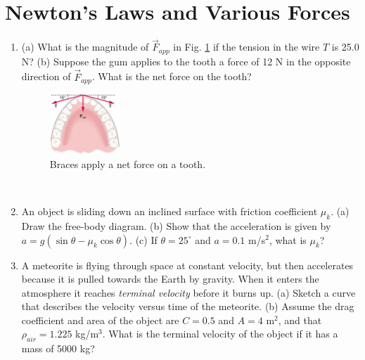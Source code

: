 \documentclass[10pt]{article}
\begin{document}
\section{Newton's Laws and Various Forces}
\begin{enumerate}
\item (a) What is the magnitude of $\vec{F}_{app}$ in Fig. \ref{fig:mouth} if the tension in the wire $T$ is 25.0 N?  (b) Suppose the gum applies to the tooth a force of 12 N in the opposite direction of $\vec{F}_{app}$.  What is the net force on the tooth?
\begin{figure}[hb]
\centering
\includegraphics[width=0.25\textwidth]{figures/mouth.png}
\caption{\label{fig:mouth} Braces apply a net force on a tooth.}
\end{figure} \\
\item An object is sliding down an inclined surface with friction coefficient $\mu_k$. (a) Draw the free-body diagram.  (b) Show that the acceleration is given by $a = g(\sin\theta-\mu_k \cos\theta)$.  (c) If $\theta=25^{\circ}$ and $a=0.1$ m/s$^2$, what is $\mu_k$? \\ \vspace{2.5cm}
\item A meteorite is flying through space at constant velocity, but then accelerates because it is pulled towards the Earth by gravity.  When it enters the atmosphere it reaches \textit{terminal velocity} before it burns up. (a) Sketch a curve that describes the velocity versus time of the meteorite.  (b) Assume the drag coefficient and area of the object are $C=0.5$ and $A=4$ m$^2$, and that $\rho_{air} = 1.225$ kg/m$^3$.  What is the terminal velocity of the object if it has a mass of 5000 kg? \\ \vspace{3cm}
\end{enumerate}
\end{document}
